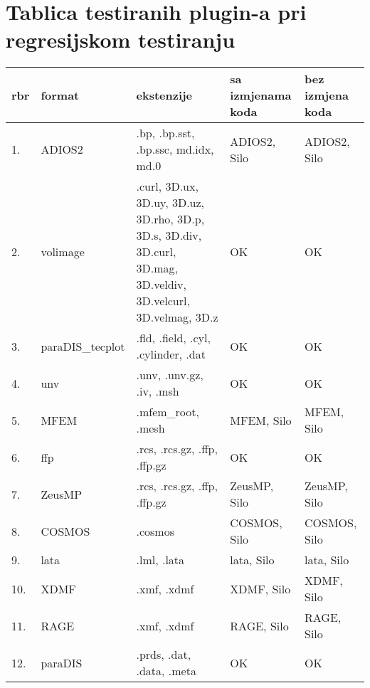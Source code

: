 \documentclass[times, utf8, zavrsni]{fer}
\begin{document}
\appendix
\chapter{Tablica testiranih plugin-a pri regresijskom testiranju}
\begin{longtable}{|l|p{70pt}|p{100pt}|p{100pt}| p{100pt}|}
	\hline
	\textbf{rbr} & \textbf{format} & \textbf{ekstenzije} & \textbf{sa izmjenama koda} & \textbf{bez izmjena koda}\\
	\hline
	\endhead %
	1. & ADIOS2 & .bp, .bp.sst, .bp.ssc, md.idx, md.0 & \cellcolor{yellow} ADIOS2, Silo & \cellcolor{yellow} ADIOS2, Silo\\
	\hline
	2. & volimage & .curl, 3D.ux, 3D.uy, 3D.uz, 3D.rho, 3D.p, 3D.s, 3D.div, 3D.curl, 3D.mag, 3D.veldiv, 3D.velcurl, 3D.velmag, 3D.z & \cellcolor{green} OK & \cellcolor{green}OK\\
	\hline
	3. & paraDIS\_tecplot & .fld, .field, .cyl, .cylinder, .dat & \cellcolor{green} OK & \cellcolor{green} OK\\
	\hline
	4. & unv & .unv, .unv.gz, .iv, .msh & \cellcolor{green} OK & \cellcolor{green} OK\\
	\hline
	5. & MFEM & .mfem\_root, .mesh & \cellcolor{yellow} MFEM, Silo & \cellcolor{yellow} MFEM, Silo\\
	\hline
	6. & ffp & .rcs, .rcs.gz, .ffp, .ffp.gz & \cellcolor{green} OK & \cellcolor{green} OK\\
	\hline
	7. & ZeusMP & .rcs, .rcs.gz, .ffp, .ffp.gz & \cellcolor{yellow} ZeusMP, Silo & \cellcolor{yellow} ZeusMP, Silo\\
	\hline
	8. & COSMOS & .cosmos & \cellcolor{yellow} COSMOS, Silo & \cellcolor{yellow} COSMOS, Silo\\
	\hline
	\hline
	9. & lata & .lml, .lata & \cellcolor{yellow} lata, Silo & \cellcolor{yellow} lata, Silo\\
	\hline
	10. & XDMF & .xmf, .xdmf & \cellcolor{yellow} XDMF, Silo & \cellcolor{yellow} XDMF, Silo\\
	\hline
	11. & RAGE & .xmf, .xdmf & \cellcolor{yellow} RAGE, Silo & \cellcolor{yellow} RAGE, Silo\\
	\hline
	12. & paraDIS & .prds, .dat, .data, .meta & \cellcolor{green} OK & \cellcolor{green} OK \\
	\hline
\end{longtable}
\end{document}
